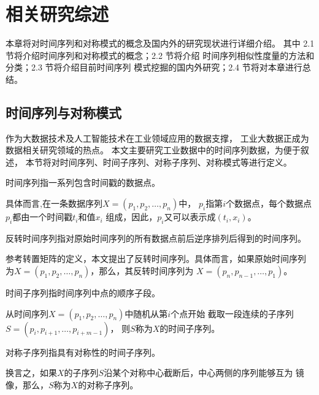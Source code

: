 
\chapter{相关研究综述}
本章将对时间序列和对称模式的概念及国内外的研究现状进行详细介绍。
其中 2.1 节将介绍时间序列和对称模式的概念；2.2 节将介绍
时间序列相似性度量的方法和分类；2.3 节将介绍目前时间序列
模式挖掘的国内外研究；2.4 节将对本章进行总结。

\section{时间序列与对称模式}
作为大数据技术及人工智能技术在工业领域应用的数据支撑，
工业大数据正成为数据相关研究领域的热点。
本文主要研究工业数据中的时间序列数据，为便于叙述，
本节将对时间序列、时间子序列、对称子序列、对称模式等进行定义。

\begin{definition}
  时间序列指一系列包含时间戳的数据点。

  具体而言,在一条数据序列$X = \left( p_1,p_2,\dots,p_n \right)$中，
  $p_i$指第$i$个数据点，每个数据点$p_i$都由一个时间戳$t_i$和值$x_i$
  组成，因此，$p_i$又可以表示成$\left( t_i,x_i \right)$。
\end{definition}

\begin{definition}
  反转时间序列指对原始时间序列的所有数据点前后逆序排列后得到的时间序列。

  参考转置矩阵的定义，本文提出了反转时间序列。具体而言，如果原始时间序列
  为$X = \left( p_1,p_2,\dots,p_n \right)$，那么，其反转时间序列为
  $X = \left( p_n,p_{n-1},\dots,p_1 \right)$。
\end{definition}

\begin{definition}
  时间子序列指时间序列中点的顺序子段。

  从时间序列$X=\left( p_1,p_2,\dots,p_n \right)$中随机从第$i$个点开始
  截取一段连续的子序列$S = \left( p_i,p_{i+1},\dots,p_{i+m-1} \right)$，
  则$S$称为$X$的时间子序列。 
\end{definition}

\begin{definition}
  对称子序列指具有对称性的时间子序列。

  换言之，如果$X$的子序列$S$沿某个对称中心截断后，中心两侧的序列能够互为
  镜像，那么，$S$称为$X$的对称子序列。 
\end{definition}

